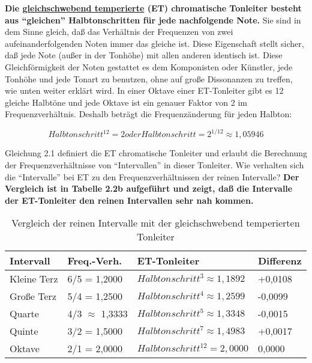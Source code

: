 \hypertarget{et1}{}

\textbf{Die \hyperlink{et}{gleichschwebend temperierte} (ET) chromatische Tonleiter besteht aus \enquote{gleichen} Halbtonschritten für jede nachfolgende Note.}
Sie sind in dem Sinne gleich, daß das Verhältnis der Frequenzen von zwei aufeinanderfolgenden Noten immer das gleiche ist.
Diese Eigenschaft stellt sicher, daß jede Note (außer in der Tonhöhe) mit allen anderen identisch ist.
Diese Gleichförmigkeit der Noten gestattet es dem Komponisten oder Künstler, jede Tonhöhe und jede Tonart zu benutzen, ohne auf große Dissonanzen zu treffen, wie unten weiter erklärt wird.
In einer Oktave einer ET-Tonleiter gibt es 12 gleiche Halbtöne und jede Oktave ist ein genauer Faktor von 2 im Frequenzverhältnis.
Deshalb beträgt die Frequenzänderung für jeden Halbton:


\hypertarget{gleich21}{}
\begin{equation}
 Halbtonschritt^{12} = 2 oder Halbtonschritt = 2^{1/12} \approx 1,05946
\end{equation}


Gleichung 2.1 definiert die ET chromatische Tonleiter und erlaubt die Berechnung der Frequenzverhältnisse von \enquote{Intervallen} in dieser Tonleiter.
Wie verhalten sich die \enquote{Intervalle} bei ET zu den Frequenzverhältnissen der reinen Intervalle?
\textbf{Der Vergleich ist in Tabelle 2.2b aufgeführt und zeigt, daß die Intervalle der ET-Tonleiter den reinen Intervallen sehr nah kommen.}

\begin{table}
 \begin{tabular}{l|l|l|l}
 \textbf{Intervall} & \textbf{Freq.-Verh.} & \textbf{ET-Tonleiter} & \textbf{Differenz} \\ 
 \hline
 Kleine Terz & 6/5 = 1,2000 & $Halbtonschritt^3 \approx 1,1892$ & +0,0108 \\ 
 Große Terz & 5/4 = 1,2500 & $Halbtonschritt^4 \approx 1,2599$ & -0,0099 \\ 
 Quarte & 4/3 $\approx$ 1,3333 & $Halbtonschritt^5 \approx 1,3348$ & -0,0015 \\ 
 Quinte & 3/2 = 1,5000 & $Halbtonschritt^7 \approx 1,4983$ & +0,0017 \\ 
 Oktave & 2/1 = 2,0000 & $Halbtonschritt^{12} = 2,0000$ & 0,0000 \\ 
 \end{tabular}
 \caption{Vergleich der reinen Intervalle mit der gleichschwebend temperierten Tonleiter}
\end{table}

